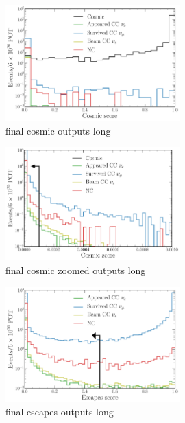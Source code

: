 \begin{figure} %
    \includegraphics[width=0.6\textwidth]{diagrams/6-cvn/chipsnet/final_cosmic_outputs.pdf}
    \caption[final cosmic outputs short]
    {final cosmic outputs long}
    \label{fig:final_cosmic_outputs}
\end{figure}

\begin{figure} %
    \includegraphics[width=0.6\textwidth]{diagrams/6-cvn/chipsnet/final_cosmic_zoomed_outputs.pdf}
    \caption[final cosmic zoomed outputs short]
    {final cosmic zoomed outputs long}
    \label{fig:final_cosmic_zoomed_outputs}
\end{figure}

\begin{figure} %
    \includegraphics[width=0.6\textwidth]{diagrams/6-cvn/chipsnet/final_escapes_outputs.pdf}
    \caption[final escapes outputs short]
    {final escapes outputs long}
    \label{fig:final_escapes_outputs}
\end{figure}

